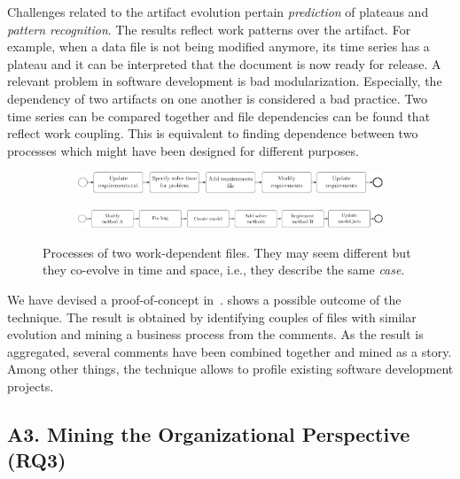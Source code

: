 \documentclass[a4paper,11pt]{article}
\begin{document}
Challenges related to the artifact evolution pertain \emph{prediction} of plateaus and \emph{pattern recognition}. The results reflect work patterns over the artifact. For example, when a data file is not being modified anymore, its time series has a plateau and it can be interpreted that the document is now ready for release. 
A relevant problem in software development is bad modularization. Especially, the dependency of two artifacts on one another is considered a bad practice. Two time series can be compared together and file dependencies can be found that reflect work coupling. This is equivalent to finding dependence between two processes which might have been designed for different purposes. 
\begin{figure}[h]
	\begin{subfigure}[b]{\textwidth}
		\centering
		\includegraphics[width=\linewidth]{figures/requirementsTxtProcess}
		\label{subfig:requirements-file-process}
	\end{subfigure}
	\begin{subfigure}[hb]{\textwidth}
		\centering
		\includegraphics[width=\linewidth]{figures/modelProcess}
		\label{subfig:model-file-process}
	\end{subfigure}
	\caption{Processes of two work-dependent files. They may seem different but they co-evolve in time and space, i.e., they describe the same \emph{case}.}
	\label{fig:evaluated-processes}
\end{figure}

We have devised a proof-of-concept in~\cite{Bala2017a}.  shows a possible outcome of the technique. The result is obtained by identifying couples of files with similar evolution and mining a business process from the comments. As the result is aggregated, several comments have been combined together and mined as a story. Among other things, the technique allows to profile existing software development projects.

\subsection{A3. Mining the Organizational Perspective (RQ3)}
\end{document}
